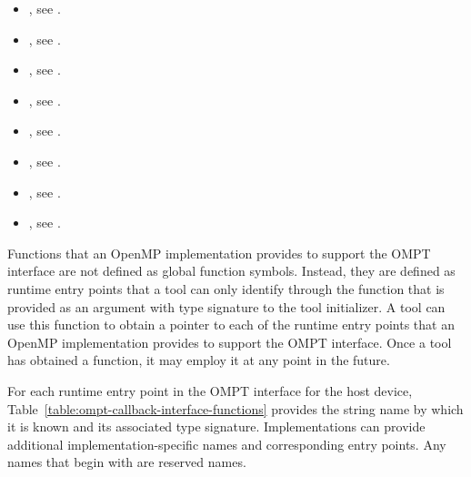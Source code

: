 \crossreferences
\begin{itemize}
\item {}, see .
\item {}, see
  .

\item {}, see .

\item {}, 
see .

\item {}, see .

\item {}, 
see .

\item {}, see .

\item {}, see .

\end{itemize}



\label{sec:ompt-bind}

Functions that an OpenMP implementation provides to support the OMPT interface
are not defined as global function symbols. Instead, they are defined as runtime 
entry points that a tool can only identify through the  function that
is provided as an argument with type signature  to 
the tool initializer. A tool can use this function to obtain a pointer to each of 
the runtime entry points that an OpenMP implementation provides to support the OMPT 
interface. Once a tool has obtained a  function, it may employ it at 
any point in the future.

For each runtime entry point in the OMPT interface for the host device,
Table~\ref{table:ompt-callback-interface-functions} provides the string
name by which it is known and its associated type signature. Implementations
can provide additional implementation-specific names and corresponding
entry points.  Any names that begin with  are reserved names.


